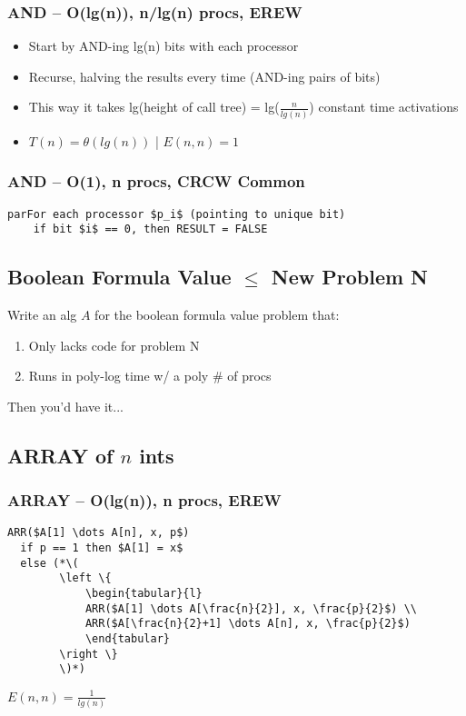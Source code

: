\documentclass[12pt]{article}
\providecommand{\tightlist}{
    \setlength{\itemsep}{0pt}\setlength{\parskip}{0pt}
}
\providecommand{\reducible}[2]{
  \textbf{#1} $\leq$ \textbf{#2}
}
\begin{document}
\subsubsection{AND -- O(lg(n)), n/lg(n) procs, EREW}
\begin{itemize}\tightlist
  \item Start by AND-ing lg(n) bits with each processor
  \item Recurse, halving the results every time (AND-ing pairs of bits)
  \item This way it takes lg(height of call tree) = lg($\frac{n}{lg(n)}$) constant time activations
  \item $T(n) = \theta(lg(n))$ | $E(n,n) = 1$
\end{itemize}\tightlist
\subsubsection{AND -- O(1), n procs, CRCW Common}
\begin{lstlisting}
parFor each processor $p_i$ (pointing to unique bit)
    if bit $i$ == 0, then RESULT = FALSE
\end{lstlisting}


\subsection{\reducible{Boolean Formula Value}{New Problem N}}
Write an alg $A$ for the boolean formula value problem that:\\
\begin{enumerate}\tightlist
  \item Only lacks code for problem N
  \item Runs in poly-log time w/ a poly # of procs
\end{enumerate}
Then you'd have it...


\subsection{ARRAY of $n$ ints}
\subsubsection{ARRAY -- O(lg(n)), n procs, EREW}
\begin{lstlisting}
ARR($A[1] \dots A[n], x, p$)
  if p == 1 then $A[1] = x$
  else (*\(
        \left \{
            \begin{tabular}{l}
            ARR($A[1] \dots A[\frac{n}{2}], x, \frac{p}{2}$) \\
            ARR($A[\frac{n}{2}+1] \dots A[n], x, \frac{p}{2}$)
            \end{tabular}
        \right \}
        \)*)
\end{lstlisting}
$E(n,n) = \frac{1}{lg(n)}$
\end{document}
